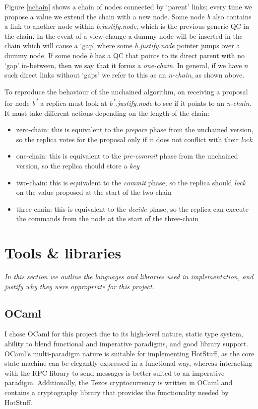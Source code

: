 Figure \ref{nchain} shows a chain of nodes connected by `parent' links; every time we propose a value we extend the chain with a new node. Some node \textit{b} also contains a link to another node within \textit{b.justify.node}, which is the previous generic QC in the chain. In the event of a view-change a dummy node will be inserted in the chain which will cause a `gap' where some \textit{b.justify.node} pointer jumps over a dummy node. If some node \textit{b} has a QC that points to its direct parent with no `gap' in-between, then we say that it forms a \textit{one-chain}. In general, if we have $n$ such direct links without `gaps' we refer to this as an \textit{n-chain}, as shown above.

To reproduce the behaviour of the unchained algorithm, on receiving a proposal for node \textit{b\textsuperscript{*}} a replica must look at \textit{b\textsuperscript{*}.justify.node} to see if it points to an \textit{n-chain}. It must take different actions depending on the length of the chain:

\begin{itemize}
\item zero-chain: this is equivalent to the \textit{prepare} phase from the unchained version, so the replica votes for the proposal only if it does not conflict with their \textit{lock}
\item one-chain: this is equivalent to the \textit{pre-commit} phase from the unchained version, so the replica should store a \textit{key}
\item two-chain: this is equivalent to the \textit{commit} phase, so the replica should \textit{lock} on the value proposed at the start of the two-chain
\item three-chain: this is equivalent to the \textit{decide} phase, so the replica can execute the commands from the node at the start of the three-chain
\end{itemize}

\section{Tools \& libraries} \label{tools}
\textit{In this section we outline the languages and libraries used in implementation, and justify why they were appropriate for this project.}

\subsection{OCaml}
I chose OCaml for this project due to its high-level nature, static type system, ability to blend functional and imperative paradigms, and good library support. OCaml's multi-paradigm nature is suitable for implementing HotStuff, as the core state machine can be elegantly expressed in a functional way, whereas interacting with the RPC library to send messages is better suited to an imperative paradigm. Additionally, the Tezos cryptocurrency is written in OCaml and contains a cryptography library that provides the functionality needed by HotStuff.

